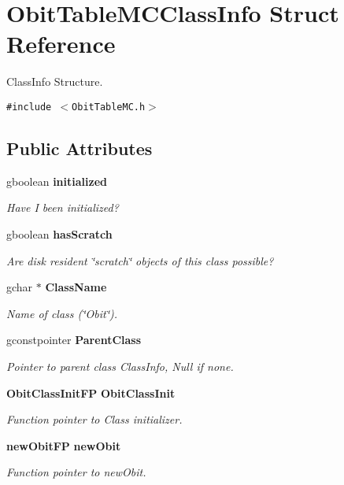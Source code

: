 \section{Obit\-Table\-MCClass\-Info Struct Reference}
\label{structObitTableMCClassInfo}
Class\-Info Structure.  


{\tt \#include $<$Obit\-Table\-MC.h$>$}

\subsection*{Public Attributes}
\begin{CompactItemize}
\item 
gboolean {\bf initialized}
\begin{CompactList}\small\item\em Have I been initialized? \item\end{CompactList}\item 
gboolean {\bf has\-Scratch}
\begin{CompactList}\small\item\em Are disk resident \char`\"{}scratch\char`\"{} objects of this class possible? \item\end{CompactList}\item 
gchar $\ast$ {\bf Class\-Name}
\begin{CompactList}\small\item\em Name of class (\char`\"{}Obit\char`\"{}). \item\end{CompactList}\item 
gconstpointer {\bf Parent\-Class}
\begin{CompactList}\small\item\em Pointer to parent class Class\-Info, Null if none. \item\end{CompactList}\item 
{\bf Obit\-Class\-Init\-FP} {\bf Obit\-Class\-Init}
\begin{CompactList}\small\item\em Function pointer to Class initializer. \item\end{CompactList}\item 
{\bf new\-Obit\-FP} {\bf new\-Obit}
\begin{CompactList}\small\item\em Function pointer to new\-Obit. \item\end{CompactList}\item 

\end{CompactItemize}
